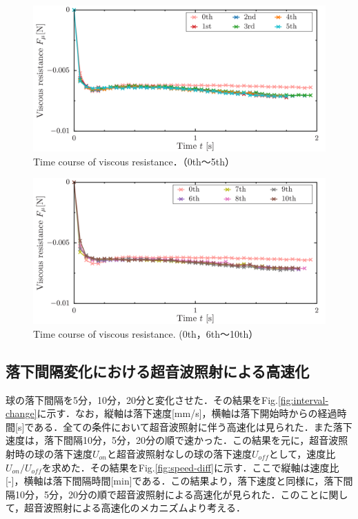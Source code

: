 \begin{figure}[ht]
    \begin{center}
        \includegraphics[width=15cm,clip]{5-Discussion/1-5-fmu.png}
        \caption{Time course of viscous resistance．（0th～5th）}
        \label{fig:1-5-fmu}
    \end{center}
\end{figure}
\begin{figure}[ht]
    \begin{center}
        \includegraphics[width=15cm,clip]{5-Discussion/6-10-fmu.png}
        \caption{Time course of viscous resistance. (0th，6th～10th）}
        \label{fig:6-10-fmu}
    \end{center}
\end{figure}
\clearpage

\subsection{落下間隔変化における超音波照射による高速化}

球の落下間隔を5分，10分，20分と変化させた．その結果をFig.\ref{fig:interval-change}に示す．なお，縦軸は落下速度[mm/s]，横軸は落下開始時からの経過時間[s]である．全ての条件において超音波照射に伴う高速化は見られた．また落下速度は，落下間隔10分，5分，20分の順で速かった．この結果を元に，超音波照射時の球の落下速度$U_{on}$と超音波照射なしの球の落下速度$U_{off}$として，速度比$U_{on}/U_{off}$を求めた．その結果をFig.\ref{fig:speed-diff}に示す．ここで縦軸は速度比[-]，横軸は落下間隔時間[min]である．この結果より，落下速度と同様に，落下間隔10分，5分，20分の順で超音波照射による高速化が見られた．このことに関して，超音波照射による高速化のメカニズムより考える．

